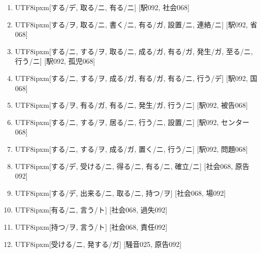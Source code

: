 \begin{enumerate}
\item \begin{CJK}{UTF8}{ipxm}[する/デ, 取る/ニ, 有る/ニ] [駅092, 社会068]\end{CJK}
\item \begin{CJK}{UTF8}{ipxm}[する/ヲ, 取る/ニ, 書く/ニ, 有る/ガ, 設置/ニ, 連絡/ニ] [駅092, 省068]\end{CJK}
\item \begin{CJK}{UTF8}{ipxm}[する/ニ, する/ヲ, 取る/ニ, 成る/ガ, 有る/ガ, 発生/ガ, 至る/ニ, 行う/ニ] [駅092, 孤児068]\end{CJK}
\item \begin{CJK}{UTF8}{ipxm}[する/ニ, する/ヲ, 成る/ガ, 有る/ガ, 有る/ニ, 行う/デ] [駅092, 国068]\end{CJK}
\item \begin{CJK}{UTF8}{ipxm}[する/ヲ, 有る/ガ, 有る/ニ, 発生/ガ, 行う/ニ] [駅092, 被告068]\end{CJK}
\item \begin{CJK}{UTF8}{ipxm}[する/ニ, する/ヲ, 居る/ニ, 行う/ニ, 設置/ニ] [駅092, センター068]\end{CJK}
\item \begin{CJK}{UTF8}{ipxm}[する/ニ, する/ヲ, 成る/ガ, 置く/ニ, 行う/ニ] [駅092, 問題068]\end{CJK}
\item \begin{CJK}{UTF8}{ipxm}[する/デ, 受ける/ニ, 得る/ニ, 有る/ニ, 確立/ニ] [社会068, 原告092]\end{CJK}
\item \begin{CJK}{UTF8}{ipxm}[する/デ, 出来る/ニ, 取る/ニ, 持つ/ヲ] [社会068, 場092]\end{CJK}
\item \begin{CJK}{UTF8}{ipxm}[有る/ニ, 言う/ト] [社会068, 過失092]\end{CJK}
\item \begin{CJK}{UTF8}{ipxm}[持つ/ヲ, 言う/ト] [社会068, 責任092]\end{CJK}
\item \begin{CJK}{UTF8}{ipxm}[受ける/ニ, 発する/ガ] [騒音025, 原告092]\end{CJK}

\end{enumerate}
